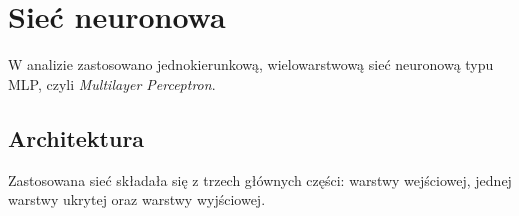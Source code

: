 \documentclass{report}
\begin{document}



\section{Sieć neuronowa}

W analizie zastosowano jednokierunkową, wielowarstwową sieć neuronową typu MLP, czyli \textit{Multilayer Perceptron}. 

\subsection*{Architektura}

Zastosowana sieć składała się z trzech głównych części: warstwy wejściowej, jednej warstwy ukrytej oraz warstwy wyjściowej. 
\end{document}
